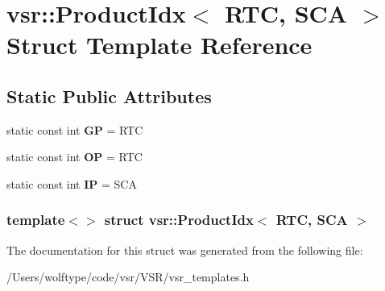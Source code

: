 \hypertarget{structvsr_1_1_product_idx_3_01_r_t_c_00_01_s_c_a_01_4}{\section{vsr\-:\-:Product\-Idx$<$ R\-T\-C, S\-C\-A $>$ Struct Template Reference}
\label{structvsr_1_1_product_idx_3_01_r_t_c_00_01_s_c_a_01_4}
}
\subsection*{Static Public Attributes}
\begin{DoxyCompactItemize}
\item 
\hypertarget{structvsr_1_1_product_idx_3_01_r_t_c_00_01_s_c_a_01_4_aa1a6544f9a09aa1e3d4d8775d1193b33}{static const int {\bfseries G\-P} = R\-T\-C}\label{structvsr_1_1_product_idx_3_01_r_t_c_00_01_s_c_a_01_4_aa1a6544f9a09aa1e3d4d8775d1193b33}

\item 
\hypertarget{structvsr_1_1_product_idx_3_01_r_t_c_00_01_s_c_a_01_4_af9b3be91b93bb867c44264d207d59cda}{static const int {\bfseries O\-P} = R\-T\-C}\label{structvsr_1_1_product_idx_3_01_r_t_c_00_01_s_c_a_01_4_af9b3be91b93bb867c44264d207d59cda}

\item 
\hypertarget{structvsr_1_1_product_idx_3_01_r_t_c_00_01_s_c_a_01_4_a3ee212c185af32a685d1db7b91ae11b4}{static const int {\bfseries I\-P} = S\-C\-A}\label{structvsr_1_1_product_idx_3_01_r_t_c_00_01_s_c_a_01_4_a3ee212c185af32a685d1db7b91ae11b4}

\end{DoxyCompactItemize}
\subsubsection*{template$<$$>$ struct vsr\-::\-Product\-Idx$<$ R\-T\-C, S\-C\-A $>$}



The documentation for this struct was generated from the following file\-:\begin{DoxyCompactItemize}
\item 
/\-Users/wolftype/code/vsr/\-V\-S\-R/vsr\-\_\-templates.\-h\end{DoxyCompactItemize}
